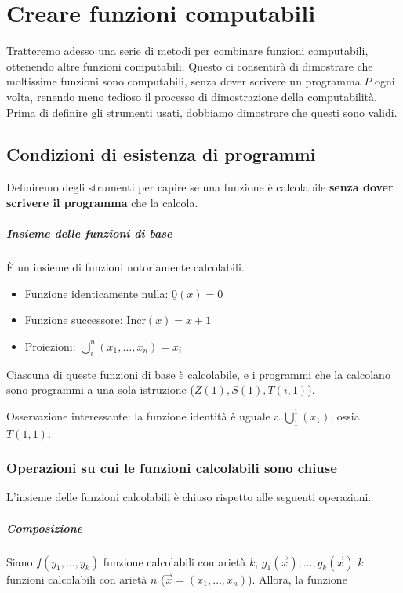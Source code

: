 	\chapter{Creare funzioni computabili}
	Tratteremo adesso una serie di metodi per combinare funzioni computabili, ottenendo altre funzioni computabili. Questo ci consentirà di dimostrare che moltissime funzioni sono computabili, senza dover scrivere un programma $P$ ogni volta, renendo meno tedioso il processo di dimostrazione della computabilità.  Prima di definire gli strumenti usati, dobbiamo dimostrare che questi sono validi.
	
	\section{Condizioni di esistenza di programmi}
	Definiremo degli strumenti per capire se una funzione è calcolabile \textbf{senza dover scrivere il programma} che la calcola.
	
	\paragraph{Insieme delle funzioni di base} È un insieme di funzioni  notoriamente calcolabili.
	\begin{itemize}
		\item Funzione identicamente nulla: $\underline{0}(x) = 0$
		\item Funzione successore: $\text {Incr}(x) = x+1$
		\item Proiezioni: $\bigcup_{i}^n(x_1, \dots, x_n) = x_i$
	\end{itemize}
	
	Ciascuna di queste funzioni di base è calcolabile, e i programmi che la calcolano sono programmi a una sola istruzione ($Z(1), S(1), T(i,1)$).
	
	Osservazione interessante: la funzione identità è uguale a $\bigcup_{1}^1(x_1)$, ossia $T(1,1)$.
	\subsection{Operazioni su cui le funzioni calcolabili sono chiuse}
	L'insieme delle funzioni calcolabili è chiuso rispetto alle seguenti operazioni.
	
	\paragraph{Composizione} 	Siano $f(y_1, \dots, y_k)$ funzione calcolabili con arietà $k$, $g_1(\vec{x}), \dots, g_k(\vec{x})$ $k$ funzioni calcolabili con arietà $n$ ($\vec{x} = (x_1, \dots, x_n)$). Allora, la funzione
	
